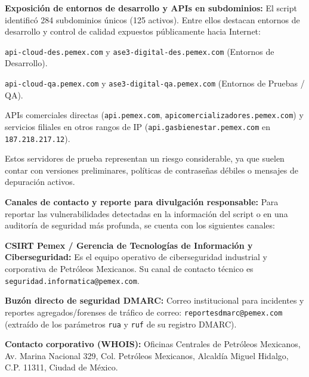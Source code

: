 \begin{itemizeColor}
    \item \textbf{Exposición de entornos de desarrollo y APIs en subdominios:}
    El script identificó 284 subdominios únicos (125 activos). Entre ellos destacan entornos de desarrollo y control de calidad expuestos públicamente hacia Internet:
    \begin{itemizeColor}
        \item \texttt{api-cloud-des.pemex.com} y \texttt{ase3-digital-des.pemex.com} (Entornos de Desarrollo).
        \item \texttt{api-cloud-qa.pemex.com} y \texttt{ase3-digital-qa.pemex.com} (Entornos de Pruebas / QA).
        \item APIs comerciales directas (\texttt{api.pemex.com}, \texttt{apicomercializadores.pemex.com}) y servicios filiales en otros rangos de IP (\texttt{api.gasbienestar.pemex.com} en \texttt{187.218.217.12}).
    \end{itemizeColor}
    Estos servidores de prueba representan un riesgo considerable, ya que suelen contar con versiones preliminares, políticas de contraseñas débiles o mensajes de depuración activos.

    \item \textbf{Canales de contacto y reporte para divulgación responsable:}
    Para reportar las vulnerabilidades detectadas en la información del script o en una auditoría de seguridad más profunda, se cuenta con los siguientes canales:
    \begin{itemizeColor}
        \item \textbf{CSIRT Pemex / Gerencia de Tecnologías de Información y Ciberseguridad:} Es el equipo operativo de ciberseguridad industrial y corporativa de Petróleos Mexicanos. Su canal de contacto técnico es \texttt{seguridad.informatica@pemex.com}.
        \item \textbf{Buzón directo de seguridad DMARC:} Correo institucional para incidentes y reportes agregados/forenses de tráfico de correo: \texttt{reportesdmarc@pemex.com} (extraído de los parámetros \texttt{rua} y \texttt{ruf} de su registro DMARC).
        \item \textbf{Contacto corporativo (WHOIS):} Oficinas Centrales de Petróleos Mexicanos, Av. Marina Nacional 329, Col. Petróleos Mexicanos, Alcaldía Miguel Hidalgo, C.P. 11311, Ciudad de México.
    \end{itemizeColor}
\end{itemizeColor}

